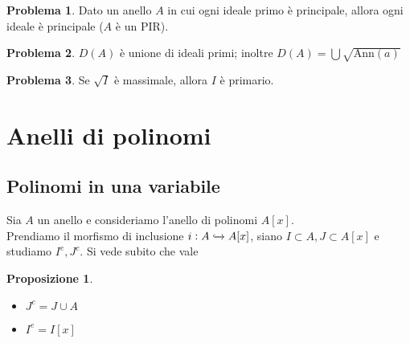 \documentclass[a4paper,10pt]{article}
\theoremstyle{plain}
\newtheorem{prop}[thm]{Proposizione}
\theoremstyle{definition}
\newtheorem{prob}{Problema}[section]
\newcommand{\ann}{\text{Ann}}
\begin{document}
\begin{prob}
    Dato un anello $A$ in cui ogni ideale primo è principale, allora ogni ideale è principale ($A$ è un PIR).
\end{prob}

\begin{prob}
    $D(A)$ è unione di ideali primi; inoltre $D(A)=\bigcup\sqrt{\ann(a)}$
\end{prob}

\begin{prob}
    Se $\sqrt I$ è massimale, allora $I$ è primario.
\end{prob}




\section{Anelli di polinomi}

\subsection{Polinomi in una variabile}
Sia $A$ un anello e consideriamo l'anello di polinomi $A[x]$.\\
Prendiamo il morfismo di inclusione $i:A\xhookrightarrow{} A[x]$, siano $I\subset A, J\subset A[x]$ e studiamo $I^e,J^c$. Si vede subito che vale
\begin{prop}
    $ $
    \begin{itemize}
        \item $J^c=J\cup A$
        \item $I^e=I[x]$
    \end{itemize}
\end{prop}
\end{document}
